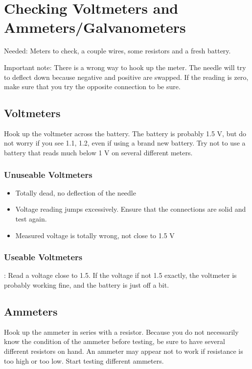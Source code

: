 \chapter{Checking Voltmeters and Ammeters/Galvanometers}

Needed: Meters to check, 
a couple wires, 
some resistors and a fresh battery.

Important note: There is a wrong way to hook up the meter. 
The needle will try to deflect down 
because negative and positive are swapped. 
If the reading is zero, 
make sure that you try the opposite connection to be sure.

\section{Voltmeters}
Hook up the voltmeter across the battery. 
The battery is probably 1.5 V, 
but do not worry if you see 1.1, 
1.2, 
even if using a brand new battery. 
Try not to use a battery that reads much below 1 V 
on several different meters.

\subsection{Unuseable Voltmeters}
\begin{itemize}
\item{Totally dead, no deflection of the needle}
\item{Voltage reading jumps excessively. 
Ensure that the connections are solid and test again.}
\item{Measured voltage is totally wrong, not close to 1.5 V}
\end{itemize}

\subsection{Useable Voltmeters}:
Read a voltage close to 1.5. 
If the voltage if not 1.5 exactly, 
the voltmeter is probably working fine, 
and the battery is just off a bit.

\section{Ammeters}
Hook up the ammeter in series with a resistor. 
Because you do not necessarily know the condition of the ammeter before testing, 
be sure to have several different resistors on hand. 
An ammeter may appear not to work if resistance is too high or too low. 
Start testing different ammeters.

